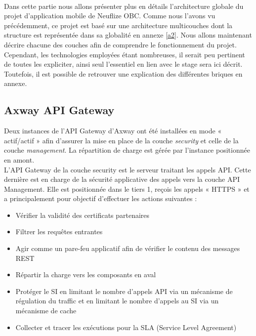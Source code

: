 \paragraph{}
Dans cette partie nous allons présenter plus en détails l'architecture globale du projet d'application mobile de Neuflize OBC. Comme nous l'avons vu précédemment, ce projet est basé sur une architecture multicouches dont la structure est représentée dans sa globalité en annexe \ref{a2}. Nous allons maintenant décrire chacune des couches afin de comprendre le fonctionnement du projet. Cependant, les technologies employées étant nombreuses, il serait peu pertinent de toutes les expliciter, ainsi seul l'essentiel en lien avec le stage sera ici décrit. Toutefois, il est possible de retrouver une explication des différentes briques en annexe.

\subsection{Axway API Gateway}
\label{axway}

	Deux instances de l'API Gateway d'Axway ont été installées en mode « actif/actif » afin d'assurer la mise en place de la couche \textit{security} et celle de la couche \textit{management}. La répartition de charge est gérée par l'instance positionnée en amont. \\
		
	L'API Gateway de la couche security est le serveur traitant les appels API. Cette dernière est en charge de la sécurité applicative des appels vers la couche API Management. Elle est positionnée dans le tiers 1, reçois les appels « HTTPS » et a principalement pour objectif d’effectuer les actions suivantes : \\
	
	\begin{itemize}
		\item Vérifier la validité des certificats partenaires
		\item Filtrer les requêtes entrantes 
		\item Agir comme un pare-feu applicatif afin de vérifier le contenu des messages REST
		\item Répartir la charge vers les composants en aval
		\item Protéger le SI en limitant le nombre d’appels API via un mécanisme de régulation du traffic et en limitant le nombre d'appels au SI via un mécanisme de cache
		\item Collecter et tracer les exécutions pour la SLA (Service Level Agreement) \\
	\end{itemize}
	
